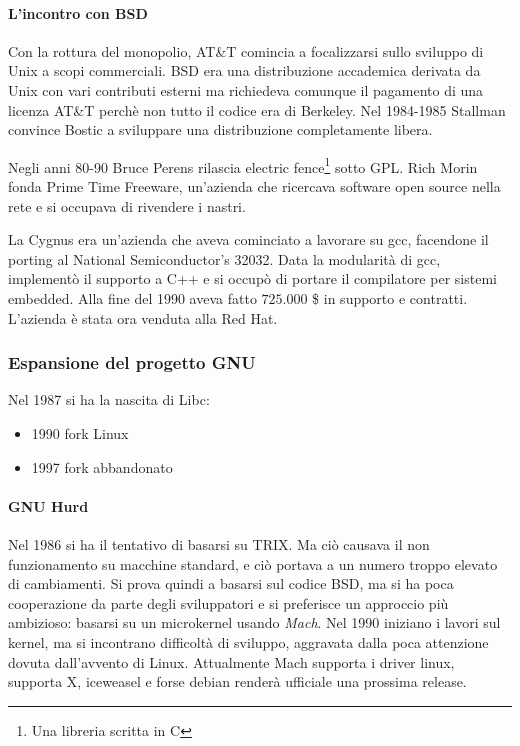 \paragraph*{L'incontro con BSD} Con la rottura del monopolio, AT\&T comincia a focalizzarsi sullo sviluppo di Unix a scopi commerciali. BSD era una distribuzione accademica derivata da Unix con vari contributi esterni ma richiedeva comunque il pagamento di una licenza AT\&T perch\`e non tutto il codice era di Berkeley. Nel 1984-1985 Stallman convince Bostic a sviluppare una distribuzione completamente libera.

Negli anni 80-90 Bruce Perens rilascia electric fence\footnote{Una libreria scritta in C} sotto GPL. Rich Morin fonda Prime Time Freeware, un'azienda che ricercava software open source nella rete e si occupava di rivendere i nastri.

La Cygnus era un'azienda che aveva cominciato a lavorare su gcc, facendone il porting al National Semiconductor's 32032. Data la modularit\`a di gcc, implement\`o il supporto a C++ e si occup\`o di portare il compilatore per sistemi embedded. Alla fine del 1990 aveva fatto $725.000$ \$ in supporto e contratti. L'azienda \`e stata ora venduta alla Red Hat.

\subsubsection{Espansione del progetto GNU}

Nel 1987 si ha la nascita di Libc:
\begin{itemize}

\item 1990 fork Linux
\item 1997 fork abbandonato

\end{itemize}

\paragraph*{GNU Hurd} Nel 1986 si ha il tentativo di basarsi su TRIX. Ma ci\`o causava il non funzionamento su macchine standard, e ci\`o portava a un numero troppo elevato di cambiamenti. Si prova quindi a basarsi sul codice BSD, ma si ha poca cooperazione da parte degli sviluppatori e si preferisce un approccio pi\`u ambizioso: basarsi su un microkernel usando \textit{Mach}. Nel 1990 iniziano i lavori sul kernel, ma si incontrano difficolt\`a di sviluppo, aggravata dalla poca attenzione dovuta dall'avvento di Linux. Attualmente Mach supporta i driver linux, supporta X, iceweasel e forse debian render\`a ufficiale una prossima release.

